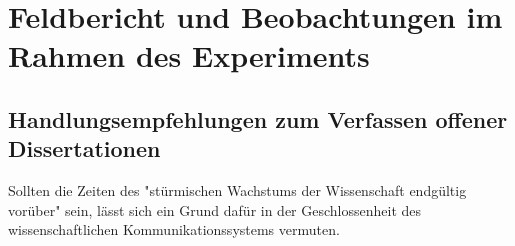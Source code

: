\section{Feldbericht und Beobachtungen im Rahmen des Experiments}
\subsection{Handlungsempfehlungen zum Verfassen offener Dissertationen}


Sollten die Zeiten des "stürmischen Wachstums der Wissenschaft endgültig vorüber" \cite{K_lbel_2002} sein, lässt sich ein Grund dafür in der Geschlossenheit des wissenschaftlichen Kommunikationssystems vermuten.